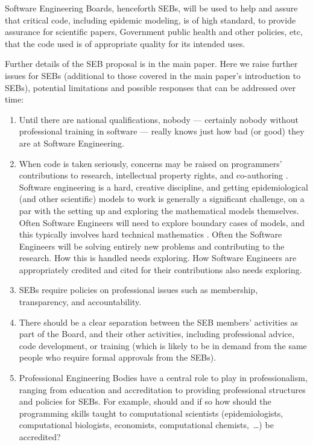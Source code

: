 \documentclass[10pt,a4paper]{article}
\begin{document}
Software Engineering Boards, henceforth SEBs, will be used to help and assure that critical code, including epidemic modeling, is of high standard, to provide assurance for scientific papers, Government public health and other policies, etc, that the code used is of appropriate quality for its intended uses.  

Further details of the SEB proposal is in the main paper. Here we raise further issues for SEBs (additional to those covered in the main paper's introduction to SEBs), potential limitations and possible responses that can be addressed over time:

\begin{enumerate}\raggedright
\item 
Until there are national qualifications, nobody --- certainly nobody without professional training in software --- really knows just how bad (or good) they are at Software Engineering.

\item
When code is taken seriously, concerns may be raised on programmers' contributions to research, intellectual property rights, and co-authoring \cite{vancouver}. Software engineering is a hard, creative discipline, and getting epidemiological (and other scientific) models to work is generally a significant challenge, on a par with the setting up and exploring the mathematical models themselves. Often Software Engineers will need to explore boundary cases of models, and this typically involves hard technical mathematics \cite{hamming}. Often the Software Engineers will be solving entirely new problems and contributing to the research. How this is handled needs exploring. How Software Engineers are appropriately credited and cited for their contributions also needs exploring.

\item 
SEBs require policies on professional issues such as membership, transparency, and accountability.
 
\item
There should be a clear separation between the SEB members' activities as part of the Board, and their other activities, including professional advice, code development, or training (which is likely to be in demand from the same people who require formal approvals from the SEBs).

\item
Professional Engineering Bodies have a central role to play in professionalism, ranging from education and accreditation to providing professional structures and policies for SEBs. For example, should and if so how should the programming skills taught to computational scientists (epidemiologists, computational biologists, economists, computational chemists,~\ldots\@) be accredited?


\end{enumerate}
\end{document}
